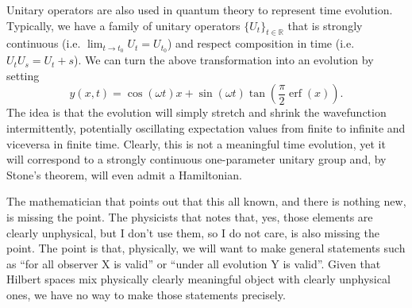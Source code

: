 \documentclass[10pt,twocolumn, nofootinbib]{revtex4-2}
\DeclareMathOperator{\erf}{erf}
\begin{document}
Unitary operators are also used in quantum theory to represent time evolution. Typically, we have a family of unitary operators $\{U_t\}_{t \in \mathbb{R}}$ that is strongly continuous (i.e. $\lim_{t \to t_0} U_t = U_{t_0}$) and respect composition in time (i.e. $U_t U_s = U_t+s$). We can turn the above transformation into an evolution by setting
\begin{equation}
	y(x, t) = \cos(\omega t) x + \sin(\omega t) \tan \left(\frac{\pi}{2}\erf(x)\right).
\end{equation}
The idea is that the evolution will simply stretch and shrink the wavefunction intermittently, potentially oscillating expectation values from finite to infinite and viceversa in finite time. Clearly, this is not a meaningful time evolution, yet it will correspond to a strongly continuous one-parameter unitary group and, by Stone's theorem, will even admit a Hamiltonian.

The mathematician that points out that this all known, and there is nothing new, is missing the point. The physicists that notes that, yes, those elements are clearly unphysical, but I don't use them, so I do not care, is also missing the point. The point is that, physically, we will want to make general statements such as ``for all observer X is valid'' or ``under all evolution Y is valid''. Given that Hilbert spaces mix physically clearly meaningful object with clearly unphysical ones, we have no way to make those statements precisely.
\end{document}
